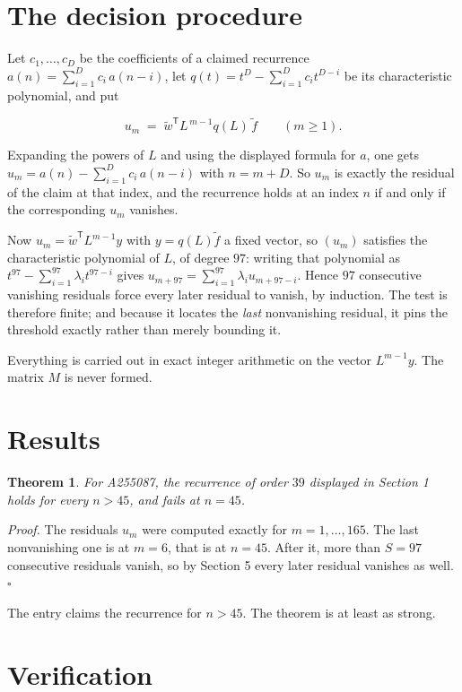 \documentclass[11pt]{article}
\newtheorem{theorem}{Theorem}
\theoremstyle{definition}
\begin{document}
\section{The decision procedure}

Let $c_1,\dots,c_D$ be the coefficients of a claimed recurrence $a(n) = \sum_{i=1}^{D} c_i\,a(n-i)$, let $q(t) = t^{D} - \sum_{i=1}^{D} c_i t^{D-i}$ be its characteristic polynomial, and put

\[u_m \;=\; \tilde w^{\mathsf T} L^{\,m-1} q(L)\,\tilde f \qquad (m \ge 1).\]

Expanding the powers of $L$ and using the displayed formula for $a$, one gets $u_m = a(n) - \sum_{i=1}^{D} c_i\,a(n-i)$ with $n = m + D$. So $u_m$ is exactly the residual of the claim at that index, and the recurrence holds at an index $n$ if and only if the corresponding $u_m$ vanishes.

Now $u_m = \tilde w^{\mathsf T} L^{m-1} y$ with $y = q(L)\tilde f$ a fixed vector, so $(u_m)$ satisfies the characteristic polynomial of $L$, of degree $97$: writing that polynomial as $t^{97} - \sum_{i=1}^{97} \lambda_i t^{97-i}$ gives $u_{m+97} = \sum_{i=1}^{97} \lambda_i u_{m+97-i}$. Hence $97$ consecutive vanishing residuals force every later residual to vanish, by induction. The test is therefore finite; and because it locates the {\itshape last} nonvanishing residual, it pins the threshold exactly rather than merely bounding it.

Everything is carried out in exact integer arithmetic on the vector $L^{m-1}y$. The matrix $M$ is never formed.

\section{Results}

\begin{theorem} For A255087, the recurrence of order $39$ displayed in Section 1 holds for every $n > 45$, and fails at $n = 45$.\end{theorem}

{\itshape Proof.} The residuals $u_m$ were computed exactly for $m = 1,\dots,165$. The last nonvanishing one is at $m = 6$, that is at $n = 45$. After it, more than $S = 97$ consecutive residuals vanish, so by Section 5 every later residual vanishes as well. $\square$

The entry claims the recurrence for $n > 45$. The theorem is at least as strong.

\section{Verification}
\end{document}
